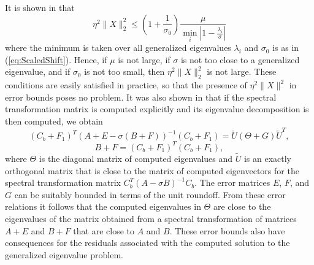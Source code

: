 It is shown in \cite{stewart2024spectraltransformationdensesymmetric} that
\begin{equation*}
  \eta^2 \|X\|_2^2 \leq \left( 1 + \frac{1}{\sigma_0} \right)
  \frac{\mu}{\min_i \left| 1 - \frac{\lambda_i}{\sigma}\right|}
\end{equation*}
where the minimum is taken over all generalized eigenvalues $\lambda_i$ and $\sigma_0$ is as in (\ref{eq:ScaledShift}). Hence, if $\mu$ is not large, if $\sigma$ is not too close to a generalized eigenvalue, and if $\sigma_0$ is not too small, then $\eta^2 \|X\|_2^2$ is not large.  These conditions are easily satisfied in practice, so that the presence of $\eta^2 \|X\|^2$ in error bounds poses no problem.  It was also shown in \cite{stewart2024spectraltransformationdensesymmetric} that if the spectral transformation matrix is computed explicitly and its eigenvalue decomposition is then computed, we obtain
\begin{equation}
  \label{eq:mixed_errors}
  (C_b + F_1)^T (A+E - \sigma (B+F))^{-1} (C_b + F_1) 
  = \tilde{U} (\Theta + G) \tilde{U}^T,
\end{equation}
\begin{equation}
  \label{eq:B_errors}
  B+F = (C_b + F_1)^T (C_b +F_1),
\end{equation}
where $\Theta$ is the diagonal matrix of computed eigenvalues and $\tilde{U}$ is an exactly orthogonal matrix that is close to the matrix of computed eigenvectors for the spectral transformation matrix $C_b^T(A-\sigma B)^{-1} C_b$.  The error matrices $E$, $F$, and $G$ can be suitably bounded in terms of the unit roundoff.  From these error relations it follows that the computed eigenvalues in $\Theta$ are close to the eigenvalues of the matrix obtained from a spectral transformation of matrices $A+E$ and $B+F$ that are close to $A$ and $B$.  These error bounds also have consequences for the residuals associated with the computed solution to the generalized eigenvalue problem.

